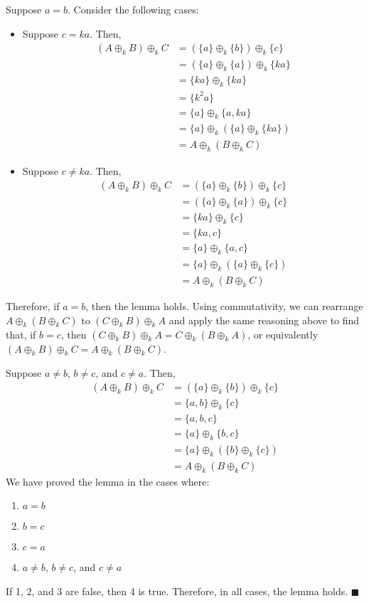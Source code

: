 \documentclass{article}
\begin{document}
Suppose $a = b$. Consider the following cases:
\begin{itemize}
    \item Suppose $c = ka$. Then,
    \[\begin{split}
        (A \oplus_k B) \oplus_k C
        &= (\{a\} \oplus_k \{b\}) \oplus_k \{c\} \\
        &= (\{a\} \oplus_k \{a\}) \oplus_k \{ka\} \\
        &= \{ka\} \oplus_k \{ka\} \\
        &= \{k^2a\} \\
        &= \{a\} \oplus_k \{a, ka\} \\
        &= \{a\} \oplus_k (\{a\} \oplus_k \{ka\}) \\
        &= A \oplus_k (B \oplus_k C)
    \end{split}\]
    \item Suppose $c \neq ka$. Then,
    \[\begin{split}
        (A \oplus_k B) \oplus_k C
        &= (\{a\} \oplus_k \{b\}) \oplus_k \{c\} \\
        &= (\{a\} \oplus_k \{a\}) \oplus_k \{c\} \\
        &= \{ka\} \oplus_k \{c\} \\
        &= \{ka, c\} \\
        &= \{a\} \oplus_k \{a, c\} \\
        &= \{a\} \oplus_k (\{a\} \oplus_k \{c\}) \\
        &= A \oplus_k (B \oplus_k C)
    \end{split}\]
\end{itemize}
Therefore, if $a = b$, then the lemma holds.
Using commutativity, we can rearrange $A \oplus_k (B \oplus_k C)$
to $(C \oplus_k B) \oplus_k A$ and apply the same reasoning
above to find that, if $b = c$, then
$(C \oplus_k B) \oplus_k A = C \oplus_k (B \oplus_k A)$,
or equivalently
$(A \oplus_k B) \oplus_k C = A \oplus_k (B \oplus_k C)$.

Suppose $a \neq b$, $b \neq c$, and $c \neq a$. Then,
\[\begin{split}
    (A \oplus_k B) \oplus_k C
    &= (\{a\} \oplus_k \{b\}) \oplus_k \{c\} \\
    &= \{a, b\} \oplus_k \{c\} \\
    &= \{a, b, c\} \\
    &= \{a\} \oplus_k \{b, c\} \\
    &= \{a\} \oplus_k (\{b\} \oplus_k \{c\}) \\
    &= A \oplus_k (B \oplus_k C)
\end{split}\]
We have proved the lemma in the cases where:
\begin{enumerate}
    \item $a = b$
    \item $b = c$
    \item $c = a$
    \item $a \neq b$, $b \neq c$, and $c \neq a$
\end{enumerate}
If 1, 2, and 3 are false, then 4 is true. Therefore,
in all cases, the lemma holds.
$\blacksquare$
\end{document}

